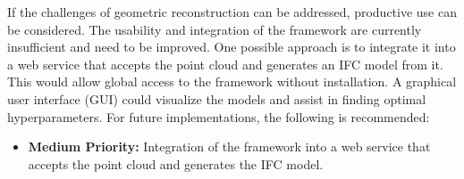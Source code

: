 \begin{English}
    If the challenges of geometric reconstruction can be addressed, productive use can be considered. The usability and integration of the framework are currently insufficient and need to be improved. One possible approach is to integrate it into a web service that accepts the point cloud and generates an IFC model from it. This would allow global access to the framework without installation. A graphical user interface (GUI) could visualize the models and assist in finding optimal hyperparameters. For future implementations, the following is recommended:

    \begin{itemize}
        \item \textbf{Medium Priority:} Integration of the framework into a web service that accepts the point cloud and generates the IFC model.
    \end{itemize}
\end{English}